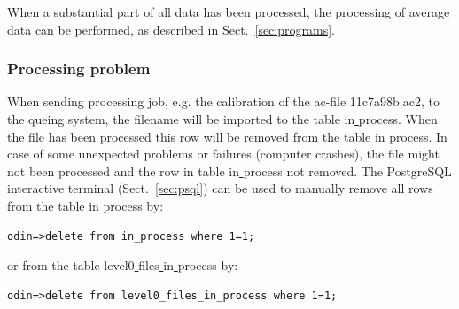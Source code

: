 \documentclass[12pt]{article}
\begin{document}
When a substantial part of all data has been processed,
the processing of average data can be performed, as described in
Sect.~\ref{sec:programs}.

\subsubsection*{Processing problem}
When sending processing job, e.g. the calibration of the 
ac-file 11c7a98b.ac2, to the queing system, 
the filename will be imported to the table in\underline{ }process.
When the file has been processed this row will be removed 
from the table in\underline{ }process.
In case of some unexpected problems or failures (computer crashes),
the file might not been processed and the row in table in\underline{ }process 
not removed.
The PostgreSQL interactive terminal (Sect.~\ref{sec:psql}) 
can be used to manually remove all rows from the table in\underline{ }process
by:
\begin{verbatim}
odin=>delete from in_process where 1=1;
\end{verbatim}
or from the table level0\underline{ }files\underline{ }in\underline{ }process
by:
\begin{verbatim}
odin=>delete from level0_files_in_process where 1=1;
\end{verbatim}


 






\clearpage
\newpage
\end{document}
